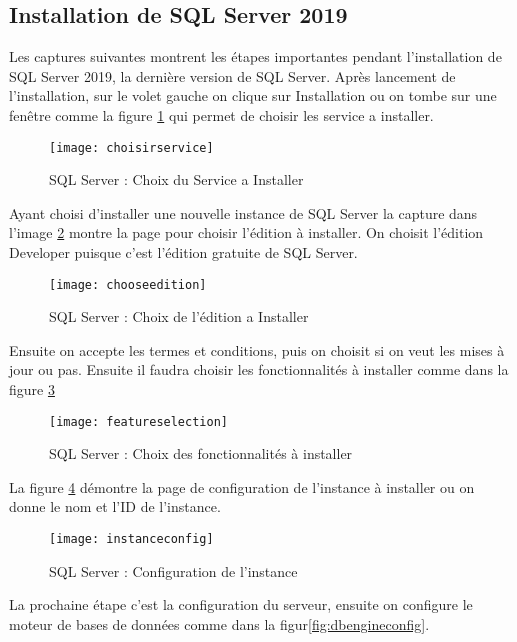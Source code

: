 \subsection{Installation de SQL Server 2019}  

Les captures suivantes montrent les étapes importantes pendant l’installation de SQL Server 2019, la dernière version de SQL Server. Après lancement de l’installation, sur le volet gauche on clique sur Installation ou on tombe sur une fenêtre comme la figure \ref{fig:choisirservice} qui permet de choisir les service a installer.
\begin{figure}[H]
    \centering
    \texttt{[image: choisirservice]}
    \caption{SQL Server : Choix du Service a Installer}
    \label{fig:choisirservice}
\end{figure} 

Ayant choisi d’installer une nouvelle instance de SQL Server la capture dans l’image \ref{fig:chooseedition} montre la page pour choisir l’édition à installer. On choisit l’édition Developer puisque c’est l’édition gratuite de SQL Server.

\begin{figure}[H]
    \centering
    \texttt{[image: chooseedition]}
    \caption{SQL Server : Choix de l’édition a Installer}
    \label{fig:chooseedition}
\end{figure} 

Ensuite on accepte les termes et conditions, puis on choisit si on veut les mises à jour ou pas. Ensuite il faudra choisir les fonctionnalités à installer comme dans la figure \ref{fig:featureselection}


\begin{figure}[H]
    \centering
    \texttt{[image: featureselection]}
    \caption{SQL Server : Choix des fonctionnalités à installer}
    \label{fig:featureselection}
\end{figure}

La figure \ref{fig:instanceconfig} démontre la page de configuration de l’instance à installer ou on donne le nom et l’ID de l’instance. 

\begin{figure}[H]
    \centering
    \texttt{[image: instanceconfig]}
    \caption{SQL Server : Configuration de l'instance}
    \label{fig:instanceconfig}
\end{figure}

La prochaine étape c’est la configuration du serveur, ensuite on configure le moteur de bases de données comme dans la figur\ref{fig:dbengineconfig}.

